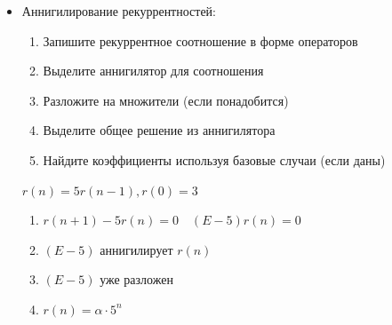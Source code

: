 \documentclass[12pt]{article}
\begin{document}
\begin{itemize}
        \Ex Оператор $(E - 2)$ аннигилирует функцию $f(n) = 2^n$

        \Exs $(E - c)$ аннигилирует $c^n$

        \Exs $(E - 3)(E - 2)$ аннигилирует $2^n + 3^n$

        \Exs $(E - c)^d$ аннигилирует любую функцию формы $p(n) \cdot C^n$, где $p(n)$ -- многочлен степени не больше $d - 1$

        \Nota Любой составной оператор аннигилирует класс функций

        \Notas Любая функция, составленная из полинома и экспоненты, имеет свой единственный аннигилятор

        Если $X$ аннигилирует $f$, то $X$ также аннигилирует $Ef$

        Если $X$ аннигилирует $f$ и $Y$ аннигилирует $g$, то $XY$ аннигилирует $f \pm g$

        \mediumvspace

        \item Аннигилирование рекуррентностей:

        \begin{enumerate}
            \item Запишите рекуррентное соотношение в форме операторов

            \item Выделите аннигилятор для соотношения

            \item Разложите на множители (если понадобится)

            \item Выделите общее решение из аннигилятора

            \item Найдите коэффициенты используя базовые случаи (если даны)
        \end{enumerate}

        \Ex $r(n) = 5r(n - 1), r(0) = 3$

        \begin{enumerate}
            \item $r(n + 1) - 5r(n) = 0 \quad (E - 5)r(n) = 0$

            \item $(E - 5)$ аннигилирует $r(n)$

            \item $(E - 5)$ уже разложен

            \item $r(n) = \alpha \cdot 5^n$


\end{enumerate}
\end{itemize}
\end{document}

